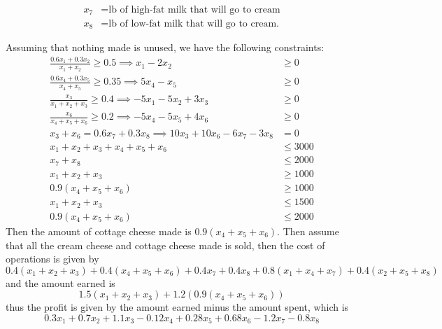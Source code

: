 \documentclass{article}
\begin{document}
\begin{enumerate}
\begin{align*}
			x_7 &= \text{lb of high-fat milk that will go to cream} \\
			x_8 &= \text{lb of low-fat milk that will go to cream.} 
		\end{align*}
		\begin{soln}
			Assuming that nothing made is unused, we have the following constraints:
			\begin{align*}
				\frac{0.6x_1+0.3x_2}{x_1+x_2} \ge 0.5 \implies x_1-2x_2 &\ge 0 \\
				\frac{0.6x_4+0.3x_5}{x_4+x_5} \ge 0.35 \implies 5x_4-x_5 &\ge 0 \\
				\frac{x_3}{x_1+x_2+x_3} \ge 0.4 \implies -5x_1-5x_2+3x_3 &\ge 0 \\
				\frac{x_6}{x_4+x_5+x_6} \ge 0.2 \implies -5x_4-5x_5+4x_6 &\ge 0 \\
				x_3+x_6=0.6x_7+0.3x_8 \implies 10x_3+10x_6-6x_7-3x_8 &= 0 \\
				x_1+x_2+x_3+x_4+x_5+x_6 &\le 3000 \\
				x_7+x_8 &\le 2000 \\
				x_1+x_2+x_3 &\ge 1000 \\
				0.9(x_4+x_5+x_6) &\ge 1000 \\
				x_1+x_2+x_3 &\le 1500 \\
				0.9(x_4+x_5+x_6) &\le 2000
			\end{align*} 
			Then the amount of cottage cheese made is $0.9(x_4+x_5+x_6).$ Then assume that all the cream cheese and cottage cheese made is sold, then the cost of operations is given by \[0.4(x_1+x_2+x_3) + 0.4(x_4+x_5+x_6) + 0.4x_7+0.4x_8+0.8(x_1+x_4+x_7) + 0.4(x_2+x_5+x_8)\] and the amount earned is \[1.5(x_1+x_2+x_3)+1.2(0.9(x_4+x_5+x_6))\] thus the profit is given by the amount earned minus the amount spent, which is \[0.3x_1+0.7x_2+1.1x_3 -0.12x_4+0.28x_5+0.68x_6-1.2x_7-0.8x_8\]


\end{soln}
\end{enumerate}
\end{document}
